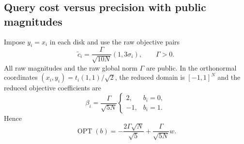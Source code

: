 \subsection{Query cost versus precision with public magnitudes}
Impose $y_i=x_i$ in each disk and use the raw objective pairs
\[
 \widetilde c_i=\frac{\Gamma}{\sqrt{10N}}(1,3\sigma_i),
 \qquad \Gamma>0.
\]
All raw magnitudes and the raw global norm $\Gamma$ are public. In the
orthonormal coordinates $(x_i,y_i)=t_i(1,1)/\sqrt2$, the reduced domain
is $[-1,1]^N$ and the reduced objective coefficients are
\[
 \beta_i=\frac{\Gamma}{\sqrt{5N}}
 \begin{cases}2,&b_i=0,\\-1,&b_i=1.\end{cases}
\]
Hence
\begin{equation}\label{query:slice-value}
 \operatorname{OPT}(b)=-\frac{2\Gamma\sqrt N}{\sqrt5}
                         +\frac{\Gamma}{\sqrt{5N}}w.
\end{equation}

